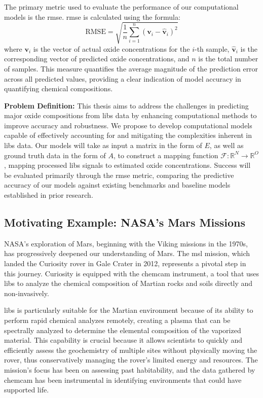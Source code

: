 The primary metric used to evaluate the performance of our computational models is the \gls{rmse}. \gls{rmse} is calculated using the formula:
\[
\text{RMSE} = \sqrt{\frac{1}{n} \sum_{i=1}^{n} (\mathbf{v}_i - \hat{\mathbf{v}}_i)^2}
\]
where \( \mathbf{v}_i \) is the vector of actual oxide concentrations for the \( i \)-th sample, \( \hat{\mathbf{v}}_i \) is the corresponding vector of predicted oxide concentrations, and \( n \) is the total number of samples. This measure quantifies the average magnitude of the prediction error across all predicted values, providing a clear indication of model accuracy in quantifying chemical compositions.

\textbf{Problem Definition:} This thesis aims to address the challenges in predicting major oxide compositions from \gls{libs} data by enhancing computational methods to improve accuracy and robustness. We propose to develop computational models capable of effectively accounting for and mitigating the complexities inherent in \gls{libs} data. Our models will take as input a matrix in the form of $E$, as well as ground truth data in the form of $A$, to construct a mapping function $\mathcal{F}: \mathbb{R}^N \rightarrow \mathbb{R}^O$, mapping processed \gls{libs} signals to estimated oxide concentrations. Success will be evaluated primarily through the \gls{rmse} metric, comparing the predictive accuracy of our models against existing benchmarks and baseline models established in prior research.

\subsection{Motivating Example: NASA's Mars Missions}
NASA's exploration of Mars, beginning with the Viking missions in the 1970s, has progressively deepened our understanding of Mars\cite{marsnasagov_vikings}. The \gls{msl} mission, which landed the Curiosity rover in Gale Crater in 2012, represents a pivotal step in this journey. Curiosity is equipped with the \gls{chemcam} instrument, a tool that uses \gls{libs} to analyze the chemical composition of Martian rocks and soils directly and non-invasively\cite{chemcamNasaWebsite}.

\gls{libs} is particularly suitable for the Martian environment because of its ability to perform rapid chemical analyzes remotely, creating a plasma that can be spectrally analyzed to determine the elemental composition of the vaporized material. This capability is crucial because it allows scientists to quickly and efficiently assess the geochemistry of multiple sites without physically moving the rover, thus conservatively managing the rover's limited energy and resources. The mission's focus has been on assessing past habitability, and the data gathered by \gls{chemcam} has been instrumental in identifying environments that could have supported life\cite{chemcamNasaWebsite,curiosityNasaWebsite}.

